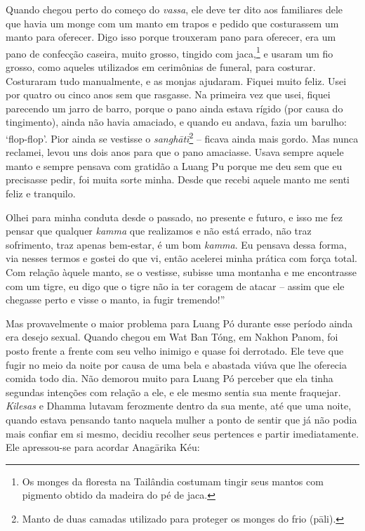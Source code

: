 Quando chegou perto do começo do \emph{vassa}, ele deve ter dito aos
familiares dele que havia um monge com um manto em trapos e pedido que
costurassem um manto para oferecer. Digo isso porque trouxeram pano para
oferecer, era um pano de confecção caseira, muito grosso, tingido com
jaca,\footnote{Os monges da floresta na Tailândia costumam tingir seus
  mantos com pigmento obtido da madeira do pé de jaca.} e usaram um fio
grosso, como aqueles utilizados em cerimônias de funeral, para costurar.
Costuraram tudo manualmente, e as monjas ajudaram. Fiquei muito feliz.
Usei por quatro ou cinco anos sem que rasgasse. Na primeira vez que
usei, fiquei parecendo um jarro de barro, porque o pano ainda estava
rígido (por causa do tingimento), ainda não havia amaciado, e quando eu
andava, fazia um barulho: `flop-flop'. Pior ainda se vestisse o
\emph{sanghātī}\footnote{Manto de duas camadas utilizado para proteger
  os monges do frio (pāli).} -- ficava ainda mais gordo. Mas nunca
reclamei, levou uns dois anos para que o pano amaciasse. Usava sempre
aquele manto e sempre pensava com gratidão a Luang Pu porque me deu sem
que eu precisasse pedir, foi muita sorte minha. Desde que recebi aquele
manto me senti feliz e tranquilo.

Olhei para minha conduta desde o passado, no presente e futuro, e isso
me fez pensar que qualquer \emph{kamma} que realizamos e não está
errado, não traz sofrimento, traz apenas bem-estar, é um bom
\emph{kamma}. Eu pensava dessa forma, via nesses termos e gostei do que
vi, então acelerei minha prática com força total. Com relação àquele
manto, se o vestisse, subisse uma montanha e me encontrasse com um
tigre, eu digo que o tigre não ia ter coragem de atacar -- assim que ele
chegasse perto e visse o manto, ia fugir tremendo!''

Mas provavelmente o maior problema para Luang Pó durante esse período
ainda era desejo sexual. Quando chegou em Wat Ban Tóng, em Nakhon Panom,
foi posto frente a frente com seu velho inimigo e quase foi derrotado.
Ele teve que fugir no meio da noite por causa de uma bela e abastada
viúva que lhe oferecia comida todo dia. Não demorou muito para Luang Pó
perceber que ela tinha segundas intenções com relação a ele, e ele mesmo
sentia sua mente fraquejar. \emph{Kilesas} e Dhamma lutavam ferozmente
dentro da sua mente, até que uma noite, quando estava pensando tanto
naquela mulher a ponto de sentir que já não podia mais confiar em si
mesmo, decidiu recolher seus pertences e partir imediatamente. Ele
apressou-se para acordar Anagārika Kéu:

